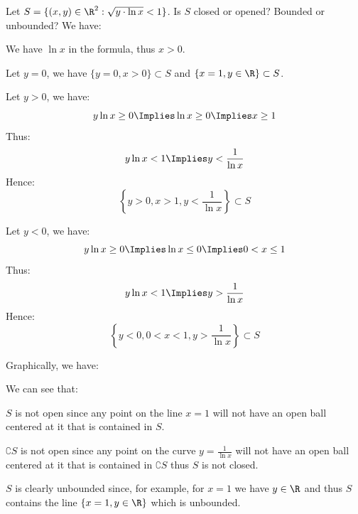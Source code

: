 \begin{eg}
    Let $S = \{(x,y) \in \R^2 : \sqrt{y \cdot \ln x} < 1\}$. Is $S$ closed or opened? Bounded or unbounded? We have:
    \begin{citemize}
        \item We have $\ln x$ in the formula, thus $x > 0$.
        \item Let $y = 0$, we have $\{y = 0, x > 0\} \subset S$ and $\{x = 1, y \in \R\} \subset S$.
        \item Let $y > 0$, we have:
        \[
            y \ln x \geq 0 \Implies \ln x \geq 0 \Implies x \geq 1
        \]
        Thus:
        \[
            y \ln x < 1 \Implies y < \frac{1}{\ln x}
        \]
        Hence:
        \[
            \left\{y > 0, x > 1, y < \frac{1}{\ln x}\right\} \subset S
        \]
        \item Let $y < 0$, we have:
        \[
            y \ln x \geq 0 \Implies \ln x \leq 0 \Implies 0 < x \leq 1
        \]
        Thus:
        \[
            y \ln x < 1 \Implies y > \frac{1}{\ln x}
        \]
        Hence:
        \[
            \left\{y < 0, 0 < x < 1, y > \frac{1}{\ln x}\right\} \subset S
        \]
    \end{citemize}
    Graphically, we have:
    \begin{center}
        \begin{tikzpicture}
            
            
        \end{tikzpicture}
    \end{center}
    We can see that:
    \begin{citemize}
        \item $S$ is not open since any point on the line $x = 1$ will not have an open ball centered at it that is contained in $S$.
        \item $\complement S$ is not open since any point on the curve $y = \frac{1}{\ln x}$ will not have an open ball centered at it that is contained in $\complement S$ thus $S$ is not closed.
        \item $S$ is clearly unbounded since, for example, for $x = 1$ we have $y \in \R$ and thus $S$ contains the line $\{x = 1, y \in \R\}$ which is unbounded.
    \end{citemize}
\end{eg}
